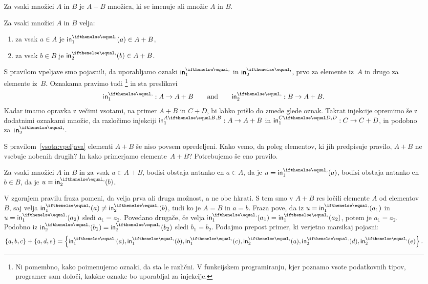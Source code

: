\begin{pravilo}[Vsota]
  \label{vsota:tvorba}
  Za vsaki množici $A$ in $B$ je $A + B$ množica, ki se imenuje  ali
   množic $A$ in $B$.
\end{pravilo}

\begin{pravilo}
  \label{vsota:vpeljava}
  Za vsaki množici $A$ in $B$ velja:
  \begin{enumerate}
  \item za vsak $a \in A$ je $\inl(a) \in A + B$,
  \item za vsak $b \in B$ je $\inr(b) \in A + B$.
  \end{enumerate}
\end{pravilo}

S pravilom vpeljave smo pojasnili, da uporabljamo oznaki $\inl$ in $\inr$, prvo za
elemente iz~$A$ in drugo za elemente iz~$B$. Oznakama pravimo tudi
\footnote{Ni pomembno, kako poimenujemo oznaki, da sta le
  različni. V funkcijskem programiranju, kjer poznamo vsote podatkovnih tipov, programer
  sam določi, kakšne oznake bo uporabljal za injekcije.} in sta preslikavi
%
\begin{equation*}
  \inl : A \to A + B
  \qquad\text{and}\qquad
  \inr : B \to A + B.
\end{equation*}
%
Kadar imamo opravka z večimi vsotami, na primer $A + B$ in $C + D$, bi lahko prišlo do
zmede glede oznak. Takrat injekcije opremimo še z dodatnimi oznakami množic, da razločimo
injekciji $\inl[A][B] : A \to A + B$ in $\inl[C][D] : C \to C + D$, in podobno za~$\inr$.

S pravilom~\ref{vsota:vpeljava} elementi $A + B$ še niso povsem opredeljeni. Kako vemo, da poleg elementov, ki jih predpisuje pravilo, $A + B$ ne vsebuje nobenih drugih? In kako primerjamo elemente~$A + B$? Potrebujemo še eno pravilo.

\begin{pravilo}
  \label{vsota:uporaba}
  Za vsaki množici $A$ in $B$ in za vsak $u \in A + B$, bodisi obstaja natanko en
  $a \in A$, da je $u = \inl(a)$, bodisi obstaja natanko en $b \in B$, da je
  $u = \inr(b)$.
\end{pravilo}

V zgornjem pravilu fraza  pomeni, da velja prva ali druga možnost, a ne obe hkrati.
%
S tem smo v $A + B$ res ločili elemente $A$ od elementov $B$, saj velja $\inl(a) \neq \inr(b)$, tudi ko je $A = B$ in $a = b$. 
%
Fraza  pove, da iz $u = \inl(a_1)$ in $u = \inl(a_2)$ sledi $a_1 = a_2$.
Povedano drugače, če velja $\inl(a_1) = \inl(a_2)$, potem je $a_1 = a_2$. Podobno iz
$\inr(b_1) = \inr(b_2)$ sledi $b_1 = b_2$.
%
Podajmo prepost primer, ki verjetno marsikaj pojasni:
%
\begin{equation*}
  \set{a, b, c} + \set{a, d, e} =
  \set{\inl(a), \inl(b), \inl(c), \inr(a), \inr(d), \inr(e)}.
\end{equation*}

